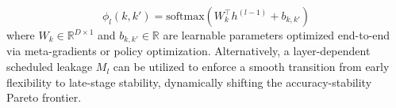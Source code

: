 \begin{itemize}
    \begin{equation}
        \phi_l(k, k') = \text{softmax}\left( W_k^{\top} h^{(l-1)} + b_{k, k'} \right)
    \end{equation}
    where $W_k \in \mathbb{R}^{D \times 1}$ and $b_{k, k'} \in \mathbb{R}$ are learnable parameters optimized end-to-end via meta-gradients or policy optimization. Alternatively, a layer-dependent scheduled leakage $M_l$ can be utilized to enforce a smooth transition from early flexibility to late-stage stability, dynamically shifting the accuracy-stability Pareto frontier.
\end{itemize}
